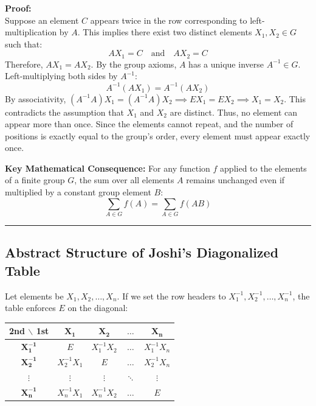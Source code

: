 \documentclass[11pt, a4paper]{report}
\begin{document}
\vspace{0.5em}
\textbf{Proof:} \\
Suppose an element $C$ appears twice in the row corresponding to left-multiplication by $A$. This implies there exist two distinct elements $X_1, X_2 \in G$ such that:
\[ A X_1 = C \quad \text{and} \quad A X_2 = C \]
Therefore, $A X_1 = A X_2$. By the group axioms, $A$ has a unique inverse $A^{-1} \in G$. Left-multiplying both sides by $A^{-1}$:
\[ A^{-1} (A X_1) = A^{-1} (A X_2) \]
By associativity, $(A^{-1} A) X_1 = (A^{-1} A) X_2 \implies E X_1 = E X_2 \implies X_1 = X_2$.
This contradicts the assumption that $X_1$ and $X_2$ are distinct. Thus, no element can appear more than once. Since the elements cannot repeat, and the number of positions is exactly equal to the group's order, every element must appear exactly once.

\vspace{0.5em}
\textbf{Key Mathematical Consequence:} For any function $f$ applied to the elements of a finite group $G$, the sum over all elements $A$ remains unchanged even if multiplied by a constant group element $B$:
\[ \sum_{A \in G} f(A) = \sum_{A \in G} f(AB) \]

\vspace{1em}
\hrule
\vspace{1em}

\subsection*{Abstract Structure of Joshi's Diagonalized Table}
Let elements be $X_1, X_2, \dots, X_n$. If we set the row headers to $X_1^{-1}, X_2^{-1}, \dots, X_n^{-1}$, the table enforces $E$ on the diagonal:

\begin{center}
\renewcommand{\arraystretch}{1.5}
\begin{tabular}{c|cccc}
\textbf{2nd $\backslash$ 1st} & $\mathbf{X_1}$ & $\mathbf{X_2}$ & $\dots$ & $\mathbf{X_n}$ \\
\hline
$\mathbf{X_1^{-1}}$ & $E$ & $X_1^{-1}X_2$ & $\dots$ & $X_1^{-1}X_n$ \\
$\mathbf{X_2^{-1}}$ & $X_2^{-1}X_1$ & $E$ & $\dots$ & $X_2^{-1}X_n$ \\
$\vdots$ & $\vdots$ & $\vdots$ & $\ddots$ & $\vdots$ \\
$\mathbf{X_n^{-1}}$ & $X_n^{-1}X_1$ & $X_n^{-1}X_2$ & $\dots$ & $E$ \\
\end{tabular}
\end{center}
\end{document}
